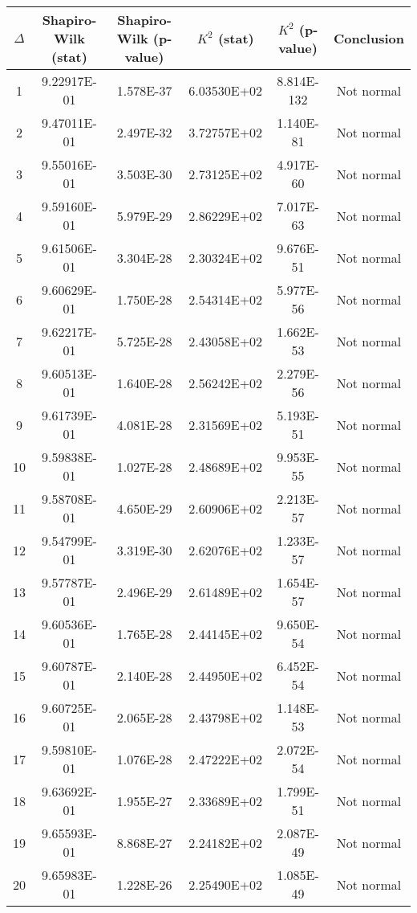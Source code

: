 \begin{table}[h]
	\begin{tabular}{|c|c|c|c|c|c|}
		\hline
		$\Delta$ &  Shapiro-Wilk (stat) & Shapiro-Wilk (p-value) & $K^2$ (stat) & $K^2$ (p-value) & Conclusion\\\hline
		\hline
		1 & 9.22917E-01 & 1.578E-37 & 6.03530E+02 & 8.814E-132 & Not normal\\\hline
		2 & 9.47011E-01 & 2.497E-32 & 3.72757E+02 & 1.140E-81 & Not normal\\\hline
		3 & 9.55016E-01 & 3.503E-30 & 2.73125E+02 & 4.917E-60 & Not normal\\\hline
		4 & 9.59160E-01 & 5.979E-29 & 2.86229E+02 & 7.017E-63 & Not normal\\\hline
		5 & 9.61506E-01 & 3.304E-28 & 2.30324E+02 & 9.676E-51 & Not normal\\\hline
		6 & 9.60629E-01 & 1.750E-28 & 2.54314E+02 & 5.977E-56 & Not normal\\\hline
		7 & 9.62217E-01 & 5.725E-28 & 2.43058E+02 & 1.662E-53 & Not normal\\\hline
		8 & 9.60513E-01 & 1.640E-28 & 2.56242E+02 & 2.279E-56 & Not normal\\\hline
		9 & 9.61739E-01 & 4.081E-28 & 2.31569E+02 & 5.193E-51 & Not normal\\\hline
		10 & 9.59838E-01 & 1.027E-28 & 2.48689E+02 & 9.953E-55 & Not normal\\\hline
		11 & 9.58708E-01 & 4.650E-29 & 2.60906E+02 & 2.213E-57 & Not normal\\\hline
		12 & 9.54799E-01 & 3.319E-30 & 2.62076E+02 & 1.233E-57 & Not normal\\\hline
		13 & 9.57787E-01 & 2.496E-29 & 2.61489E+02 & 1.654E-57 & Not normal\\\hline
		14 & 9.60536E-01 & 1.765E-28 & 2.44145E+02 & 9.650E-54 & Not normal\\\hline
		15 & 9.60787E-01 & 2.140E-28 & 2.44950E+02 & 6.452E-54 & Not normal\\\hline
		16 & 9.60725E-01 & 2.065E-28 & 2.43798E+02 & 1.148E-53 & Not normal\\\hline
		17 & 9.59810E-01 & 1.076E-28 & 2.47222E+02 & 2.072E-54 & Not normal\\\hline
		18 & 9.63692E-01 & 1.955E-27 & 2.33689E+02 & 1.799E-51 & Not normal\\\hline
		19 & 9.65593E-01 & 8.868E-27 & 2.24182E+02 & 2.087E-49 & Not normal\\\hline
		20 & 9.65983E-01 & 1.228E-26 & 2.25490E+02 & 1.085E-49 & Not normal\\\hline

\end{tabular}
\end{table}
